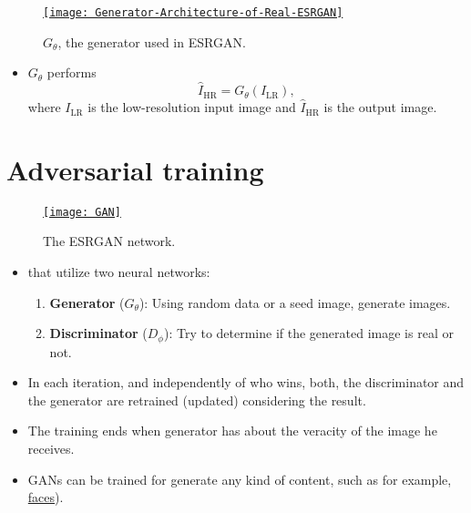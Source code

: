 \begin{figure}[H]
  \vspace{0ex}
  \centering
  \href{https://arxiv.org/abs/2207.08036}{\texttt{[image: Generator-Architecture-of-Real-ESRGAN]}}
  \caption{$G_\theta$, the generator used in \gls{ESRGAN}.}
  \label{fig:ESRGAN_generator}
\end{figure}

\begin{itemize}
\item $G_\theta$ performs
  \begin{equation}
    \hat{I}_{\text{HR}} = G_\theta(I_{\text{LR}}),
  \end{equation}
  where $I_{\text{LR}}$ is the low-resolution input image and
  $\hat{I}_{\text{HR}}$ is the  output image.
\end{itemize}

\section*{Adversarial training}

\begin{figure}[H]
  \vspace{0ex}
  \centering
  \href{https://semiengineering.com/knowledge_centers/artificial-intelligence/neural-networks/generative-adversarial-network-gan/}{\texttt{[image: GAN]}}
  \caption{The \gls{ESRGAN} network.}
  \label{fig:ESRGAN}
\end{figure}

\begin{itemize}
\item {} that
  utilize two neural networks:
  \begin{enumerate}
  \item \textbf{Generator} ($G_\theta$): Using random data or a seed image,
    generate  images.
  \item \textbf{Discriminator} ($D_\phi$): Try to determine if the generated
    image is real or not.
  \end{enumerate}
\item In each iteration, and independently of who wins, both, the
  discriminator and the generator are retrained (updated) considering
  the result.
\item The training ends when generator has   about the veracity of the image
  he receives.
\item \glspl{GAN} can be trained for generate any kind of content,
  such as for example,
  \href{https://thispersondoesnotexist.com/}{faces}).
\end{itemize}

